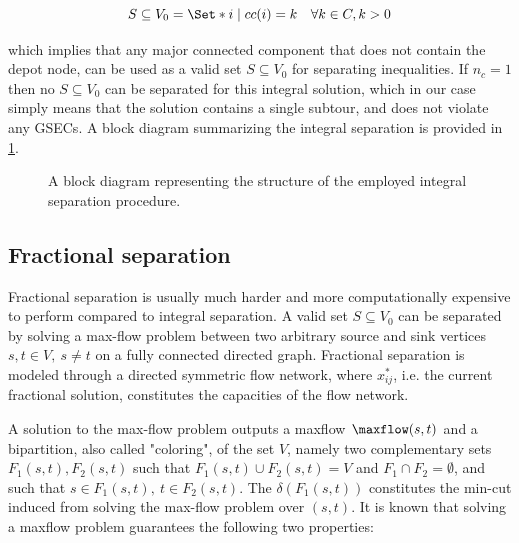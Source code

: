\begin{equation}
	S \subseteq V_0 = \Set* {i \mid cc(i) = k}   \quad \forall k \in C, k > 0
\end{equation}

which implies that any major connected component that does not contain the depot node, can be used as a valid set $S \subseteq V_0$ for separating inequalities.
If $n_c = 1$ then no $S \subseteq V_0$ can be separated for this integral solution, which in our case simply means that the solution contains a single subtour, and does not violate any GSECs.
A block diagram summarizing the integral separation is provided in \cref{fig:integral-separation-block-diagram}.

\begin{figure}[ht]
	\centering
	\caption{A block diagram representing the structure of the employed integral separation procedure.}
	\label{fig:integral-separation-block-diagram}
\end{figure}

\subsection{Fractional separation}
\label{sec:impl-fractional-separation}

Fractional separation is usually much harder and more computationally expensive to perform compared to integral separation.
A valid set $S \subseteq V_0$ can be separated by solving a max-flow problem between two arbitrary source and sink vertices $s, t \in V,\ s \ne t$ on a fully connected directed graph.
Fractional separation is modeled through a directed symmetric flow network, where $x^*_{ij}$, i.e. the current fractional solution, constitutes the capacities of the flow network.

A solution to the max-flow problem outputs a maxflow $\maxflow(s, t)$ and a bipartition, also called "coloring", of the set $V$, namely two complementary sets $F_1(s, t), F_2(s, t)$ such that $F_1(s, t) \cup F_2(s, t) = V$ and $F_1 \cap F_2 = \emptyset$, and such that $s \in F_1(s, t),\ t \in F_2(s, t)$.
The $\delta(F_1(s, t))$ constitutes the min-cut induced from solving the max-flow problem over $(s, t)$.
It is known that solving a maxflow problem guarantees the following two properties:

